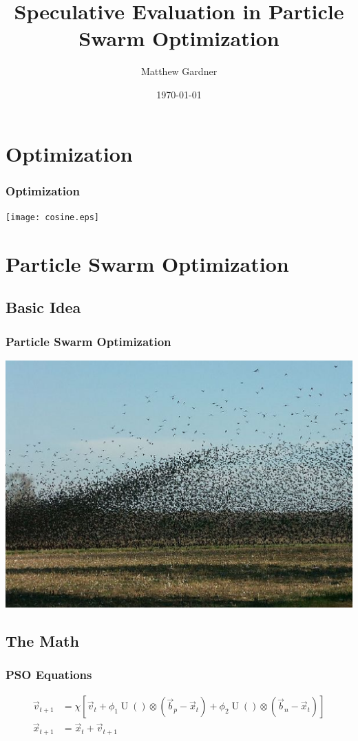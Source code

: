 \documentclass{beamer}
\title{Speculative Evaluation in Particle Swarm Optimization}
\author{Matthew Gardner}
\date{\today}
\DeclareMathOperator{\URand}{U}
\providecommand{\ppos}{\ensuremath{\Vec{x}}}
\providecommand{\pvel}{\ensuremath{\Vec{v}}}
\providecommand{\nbest}{\ensuremath{\Vec{b}_n}}
\providecommand{\pbest}{\ensuremath{\Vec{b}_p}}
\providecommand{\constriction}{\ensuremath{\chi}}
\providecommand{\coeff}{\ensuremath{\phi}}
\begin{document}
\begin{frame}
  \titlepage
\end{frame}

\section{Optimization}
\begin{frame}
  \frametitle{Optimization}
  \texttt{[image: cosine.eps]}
\end{frame}

\section{Particle Swarm Optimization}
\subsection{Basic Idea}
\begin{frame}
  \frametitle{Particle Swarm Optimization}
  \includegraphics[width=\textwidth]{birds.eps}
\end{frame}

\subsection{The Math}
\begin{frame}
  \frametitle{PSO Equations}
  \begin{align*}
	  \pvel_{t+1} &=
		  \constriction \left[ \pvel_t +
			  \coeff_1\URand()\otimes(\pbest - \ppos_t) +
			  \coeff_2\URand()\otimes(\nbest - \ppos_t)
		  \right] \\
	  \ppos_{t+1} &= \ppos_t + \pvel_{t+1}
  \end{align*}
\end{frame}
\end{document}
